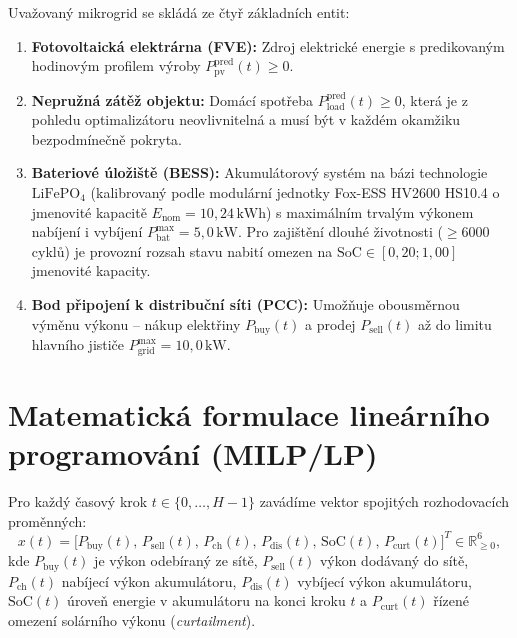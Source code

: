 \documentclass[FM,BP]{tulthesis}
\begin{document}
	Uvažovaný mikrogrid se skládá ze čtyř základních entit:
	\begin{enumerate}
		\item \textbf{Fotovoltaická elektrárna (FVE):} Zdroj elektrické energie s predikovaným hodinovým profilem výroby $P_{\text{pv}}^{\text{pred}}(t) \ge 0$.
		\item \textbf{Nepružná zátěž objektu:} Domácí spotřeba $P_{\text{load}}^{\text{pred}}(t) \ge 0$, která je z pohledu optimalizátoru neovlivnitelná a musí být v každém okamžiku bezpodmínečně pokryta.
		\item \textbf{Bateriové úložiště (BESS):} Akumulátorový systém na bázi technologie $\text{LiFePO}_4$ (kalibrovaný podle modulární jednotky Fox-ESS HV2600 HS10.4 o jmenovité kapacitě $E_{\text{nom}} = 10{,}24\,\text{kWh}$) s maximálním trvalým výkonem nabíjení i vybíjení $P_{\text{bat}}^{\max} = 5{,}0\,\text{kW}$. Pro zajištění dlouhé životnosti ($\ge 6000$ cyklů) je provozní rozsah stavu nabití omezen na $\mathrm{SoC} \in [0{,}20; 1{,}00]$ jmenovité kapacity.
		\item \textbf{Bod připojení k distribuční síti (PCC):} Umožňuje obousměrnou výměnu výkonu -- nákup elektřiny $P_{\text{buy}}(t)$ a prodej $P_{\text{sell}}(t)$ až do limitu hlavního jističe $P_{\text{grid}}^{\max} = 10{,}0\,\text{kW}$.
	\end{enumerate}

	\section{Matematická formulace lineárního programování (MILP/LP)}
	\label{sec:lp_formulace}

	Pro každý časový krok $t \in \{0, \dots, H-1\}$ zavádíme vektor spojitých rozhodovacích proměnných:
	\begin{equation}
		x(t) = \big[ P_{\text{buy}}(t), \, P_{\text{sell}}(t), \, P_{\text{ch}}(t), \, P_{\text{dis}}(t), \, \mathrm{SoC}(t), \, P_{\text{curt}}(t) \big]^T \in \mathbb{R}^6_{\ge 0},
	\end{equation}
	kde $P_{\text{buy}}(t)$ je výkon odebíraný ze sítě, $P_{\text{sell}}(t)$ výkon dodávaný do sítě, $P_{\text{ch}}(t)$ nabíjecí výkon akumulátoru, $P_{\text{dis}}(t)$ vybíjecí výkon akumulátoru, $\mathrm{SoC}(t)$ úroveň energie v akumulátoru na konci kroku $t$ a $P_{\text{curt}}(t)$ řízené omezení solárního výkonu (\textit{curtailment}).
\end{document}
